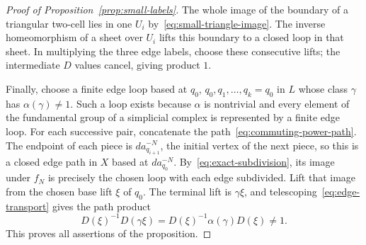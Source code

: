 \begin{proof}[Proof of Proposition~\ref{prop:small-labels}]
The whole image of the boundary of a triangular two-cell lies in one
$U_i$ by~\eqref{eq:small-triangle-image}.  The inverse homeomorphism
of a sheet over $U_i$ lifts this boundary to a closed loop in that
sheet.  In multiplying the three edge
labels, choose these consecutive lifts; the intermediate $D$ values
cancel, giving product $1$.

Finally, choose a finite edge loop based at $q_0$,
$q_0,q_1,\ldots,q_k=q_0$ in $L$ whose class $\gamma$ has
$\alpha(\gamma)\ne1$.  Such a loop exists because $\alpha$ is
nontrivial and every element of the fundamental group of a simplicial
complex is represented by a finite edge loop.  For each successive
pair, concatenate the path~\eqref{eq:commuting-power-path}.  The
endpoint of each piece is $d a_{q_{i+1}}^{-N}$, the initial vertex of
the next piece, so this is a closed edge path in $X$ based at
$d a_{q_0}^{-N}$.  By~\eqref{eq:exact-subdivision}, its image under
$f_N$ is precisely the chosen loop with each edge subdivided.
Lift that image from the chosen base lift $\xi$ of $q_0$.  The terminal lift is
$\gamma\xi$, and telescoping~\eqref{eq:edge-transport} gives the
path product
\[
 D(\xi)^{-1}D(\gamma\xi)
 =D(\xi)^{-1}\alpha(\gamma)D(\xi)\ne1.
\]
This proves all assertions of the proposition.
\end{proof}
